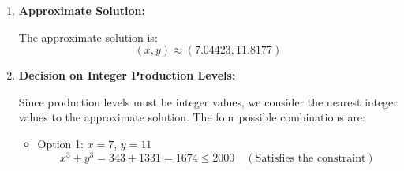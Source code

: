 \begin{example}
\begin{solution}
\begin{enumerate}
    From equation (2):
    \[
    x^2 + 3y^2 = 3\lambda y^2 \quad \Rightarrow \quad \lambda = \frac{x^2 + 3y^2}{3y^2} = \frac{x^2}{3y^2} + 1 \quad (2a)
    \]
    
    Equate the two expressions for \( \lambda \):
    \[
    \frac{2y}{3x} = \frac{x^2}{3y^2} + 1
    \]
    
    Multiply both sides by \( 3x y^2 \) to eliminate denominators:
    \[
    2y \cdot y^2 = x^3 + 3x y^2
    \]
    \[
    2y^3 = x^3 + 3x y^2 \quad (4)
    \]
    
    From the constraint (3):
    \[
    x^3 + y^3 = 2000 \quad \Rightarrow \quad x^3 = 2000 - y^3 \quad (5)
    \]
    
    Substitute \( x^3 = 2000 - y^3 \) into equation (4):
    \[
    2y^3 = (2000 - y^3) + 3x y^2
    \]
    \[
    2y^3 = 2000 - y^3 + 3x y^2
    \]
    \[
    3x y^2 = 3y^3 - 2000
    \]
    \[
    x y^2 = y^3 - \frac{2000}{3} \quad (6)
    \]
    
    Solve for \( x \):
    \[
    x = \frac{y^3 - \frac{2000}{3}}{y^2} = y - \frac{2000}{3y^2} \quad (7)
    \]
    
    Substitute \( x = y - \frac{2000}{3y^2} \) into the constraint \( x^3 + y^3 = 2000 \):
    \[
    \left(y - \frac{2000}{3y^2}\right)^3 + y^3 = 2000
    \]
    
    This equation is highly complex and does not yield to simple algebraic methods. Therefore, we proceed with an approximate numerical solution. For more detailed computations, refer to the \href{https://www.wolframalpha.com/widgets/view.jsp?id=1451afdfe5a25b2a316377c1cd488883}{Wolfram Alpha Lagrange Multipliers} tool.
    
    \item \textbf{Approximate Solution:}
    
    The approximate solution is:
    \[
    (x, y) \approx (7.04423, 11.8177)
    \]
    
    \item \textbf{Decision on Integer Production Levels:}
    
    Since production levels must be integer values, we consider the nearest integer values to the approximate solution. The four possible combinations are:

    \begin{itemize}
        \item Option 1: \( x = 7 \), \( y = 11 \)
        \[
        x^3 + y^3 = 343 + 1331 = 1674 \leq 2000 \quad (\text{Satisfies the constraint})
        \]
        

\end{itemize}
\end{enumerate}
\end{solution}
\end{example}
